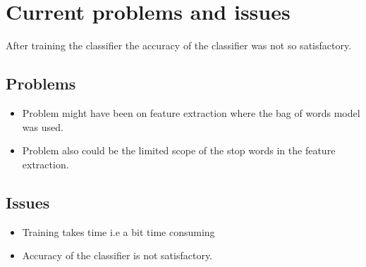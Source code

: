 \documentclass[a4paper, 12pt, onepage]{article}
\begin{document}

      \cleardoublepage
      \section{Current problems and issues}
      After training  the classifier the accuracy of the classifier was not so satisfactory.
      \subsection{Problems}
      \begin{itemize}
	\item Problem might have been on feature extraction where the bag of words model was used.
	\item Problem also could be the limited scope of the stop words in the feature extraction.
	\end{itemize}
      \subsection{Issues}
      \begin{itemize}
      \item Training takes time i.e a bit time consuming
	\item Accuracy of the classifier is not satisfactory.
	\end{itemize}
\end{document}
